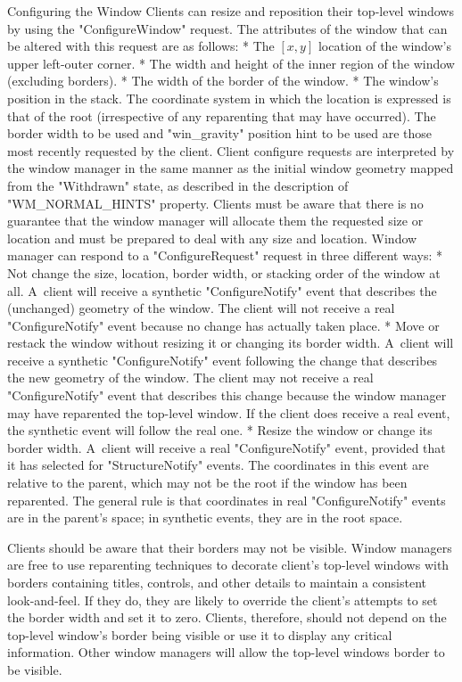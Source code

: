\secc Configuring the Window
Clients can resize and reposition their top-level windows by using the "ConfigureWindow" request.
The attributes of the window that can be altered with this request are as follows:
\begitems
* The $[x,y]$ location of the window's upper left-outer corner.
* The width and height of the inner region of the window (excluding borders).
* The width of the border of the window.
* The window's position in the stack.
\enditems
The coordinate system in which the location is expressed is that of the root (irrespective of any reparenting that may have occurred).
The border width to be used and "win_gravity" position hint to be used are those most recently requested by the client.
Client configure requests are interpreted by the window manager in the same manner as the initial window geometry mapped from the "Withdrawn" state,
as described in the description of "WM_NORMAL_HINTS" property.
Clients must be aware that there is no guarantee that the window manager will allocate them the requested size or location
and must be prepared to deal with any size and location.
Window manager can respond to a "ConfigureRequest" request in three different ways:
\begitems
* Not change the size, location, border width, or stacking order of the window at all.\nl
A~client will receive a synthetic "ConfigureNotify" event that describes the (unchanged) geometry of the window.
The client will not receive a real "ConfigureNotify" event because no change has actually taken place.
* Move or restack the window without resizing it or changing its border width.\nl
A~client will receive a synthetic "ConfigureNotify" event following the change that describes the new geometry of the window.
The client may not receive a real "ConfigureNotify" event that describes this change because the window manager may have reparented the top-level window.
If the client does receive a real event, the synthetic event will follow the real one.
* Resize the window or change its border width.\nl
A~client will receive a real "ConfigureNotify" event, provided that it has selected for "StructureNotify" events.
The coordinates in this event are relative to the parent, which may not be the root if the window has been reparented.
\enditems
The general rule is that coordinates in real "ConfigureNotify" events are in the parent's space;
in synthetic events, they are in the root space.

Clients should be aware that their borders may not be visible.
Window managers are free to use reparenting techniques to decorate client's top-level windows with borders containing titles,
controls, and other details to maintain a consistent look-and-feel.
If they do, they are likely to override the client's attempts to set the border width and set it to zero.
Clients, therefore, should not depend on the top-level window's border being visible or use it to display any critical information.
Other window managers will allow the top-level windows border to be visible.
